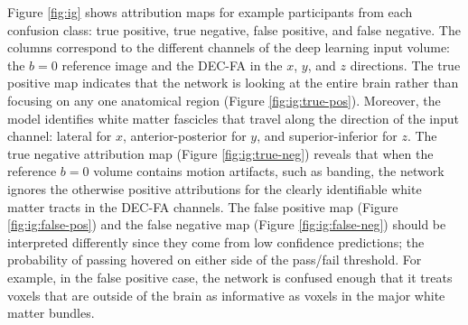 \documentclass[fleqn,10pt]{wlscirep}
\begin{document}
Figure \ref{fig:ig} shows attribution maps for example participants from each
confusion class: true positive, true negative, false positive, and false
negative. The columns correspond to the different channels of the deep learning
input volume: the $b=0$ reference image and the DEC-FA in the $x$, $y$, and $z$
directions. The true positive map indicates that the network is looking at the
entire brain rather than focusing on any one anatomical region (Figure
\ref{fig:ig:true-pos}). Moreover, the model identifies white matter fascicles
that travel along the direction of the input channel: lateral for $x$,
anterior-posterior for $y$, and superior-inferior for $z$. The true negative
attribution map (Figure \ref{fig:ig:true-neg}) reveals that when the reference
$b=0$ volume contains motion artifacts, such as banding, the network ignores the
otherwise positive attributions for the clearly identifiable white matter tracts
in the DEC-FA channels. The false positive map (Figure \ref{fig:ig:false-pos})
and the false negative map (Figure \ref{fig:ig:false-neg}) should be interpreted
differently since they come from low confidence predictions; the probability of
passing hovered on either side of the pass/fail threshold. For example, in the
false positive case, the network is confused enough that it treats voxels that
are outside of the brain as informative as voxels in the major white matter
bundles.
\end{document}
